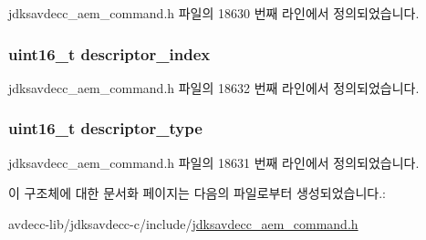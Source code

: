 jdksavdecc\+\_\+aem\+\_\+command.\+h 파일의 18630 번째 라인에서 정의되었습니다.

\subsubsection[{\texorpdfstring{descriptor\+\_\+index}{descriptor_index}}]{\setlength{\rightskip}{0pt plus 5cm}uint16\+\_\+t descriptor\+\_\+index}\hypertarget{structjdksavdecc__aem__command__decrement__control__response_a042bbc76d835b82d27c1932431ee38d4}{}\label{structjdksavdecc__aem__command__decrement__control__response_a042bbc76d835b82d27c1932431ee38d4}


jdksavdecc\+\_\+aem\+\_\+command.\+h 파일의 18632 번째 라인에서 정의되었습니다.

\subsubsection[{\texorpdfstring{descriptor\+\_\+type}{descriptor_type}}]{\setlength{\rightskip}{0pt plus 5cm}uint16\+\_\+t descriptor\+\_\+type}\hypertarget{structjdksavdecc__aem__command__decrement__control__response_ab7c32b6c7131c13d4ea3b7ee2f09b78d}{}\label{structjdksavdecc__aem__command__decrement__control__response_ab7c32b6c7131c13d4ea3b7ee2f09b78d}


jdksavdecc\+\_\+aem\+\_\+command.\+h 파일의 18631 번째 라인에서 정의되었습니다.



이 구조체에 대한 문서화 페이지는 다음의 파일로부터 생성되었습니다.\+:\begin{DoxyCompactItemize}
\item 
avdecc-\/lib/jdksavdecc-\/c/include/\hyperlink{jdksavdecc__aem__command_8h}{jdksavdecc\+\_\+aem\+\_\+command.\+h}\end{DoxyCompactItemize}
